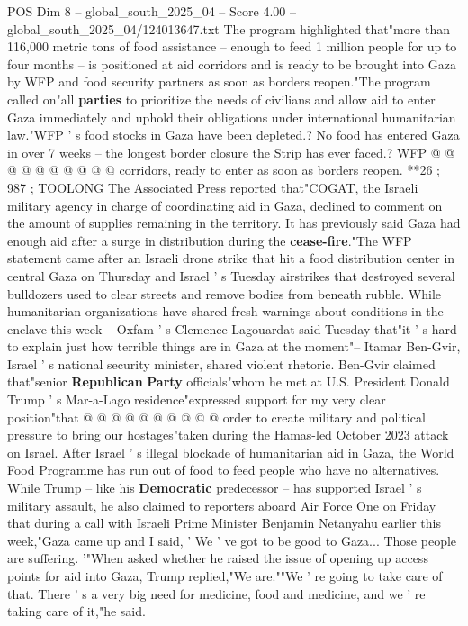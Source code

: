 \begin{textsample}{POS Dim 8 – global\_south\_2025\_04 – Score 4.00 – global\_south\_2025\_04/124013647.txt}
The program highlighted that"more than 116,000 metric tons of food assistance -- enough to feed 1 million people for up to four months -- is positioned at aid corridors and is ready to be brought into Gaza by WFP and food security partners as soon as borders reopen."The program called on"all \textbf{parties} to prioritize the needs of civilians and allow aid to enter Gaza immediately and uphold their obligations under international humanitarian law."WFP ' s food stocks in Gaza have been depleted.?
No food has entered Gaza in over 7 weeks -- the longest border closure the Strip has ever faced.?
WFP @ @ @ @ @ @ @ @ @ @ corridors, ready to enter as soon as borders reopen. **26 ; 987 ; TOOLONG The Associated Press reported that"COGAT, the Israeli military agency in charge of coordinating aid in Gaza, declined to comment on the amount of supplies remaining in the territory.
It has previously said Gaza had enough aid after a surge in distribution during the \textbf{cease-fire}."The WFP statement came after an Israeli drone strike that hit a food distribution center in central Gaza on Thursday and Israel ' s Tuesday airstrikes that destroyed several bulldozers used to clear streets and remove bodies from beneath rubble.
While humanitarian organizations have shared fresh warnings about conditions in the enclave this week -- Oxfam ' s Clemence Lagouardat said Tuesday that"it ' s hard to explain just how terrible things are in Gaza at the moment"-- Itamar Ben-Gvir, Israel ' s national security minister, shared violent rhetoric.
Ben-Gvir claimed that"senior \textbf{Republican} \textbf{Party} officials"whom he met at U.S.
President Donald Trump ' s Mar-a-Lago residence"expressed support for my very clear position"that @ @ @ @ @ @ @ @ @ @ order to create military and political pressure to bring our hostages"taken during the Hamas-led October 2023 attack on Israel.
After Israel ' s illegal blockade of humanitarian aid in Gaza, the World Food Programme has run out of food to feed people who have no alternatives.
While Trump -- like his \textbf{Democratic} predecessor -- has supported Israel ' s military assault, he also claimed to reporters aboard Air Force One on Friday that during a call with Israeli Prime Minister Benjamin Netanyahu earlier this week,"Gaza came up and I said, ' We ' ve got to be good to Gaza...
Those people are suffering. '"When asked whether he raised the issue of opening up access points for aid into Gaza, Trump replied,"We are.""We ' re going to take care of that.
There ' s a very big need for medicine, food and medicine, and we ' re taking care of it,"he said.

\end{textsample}
